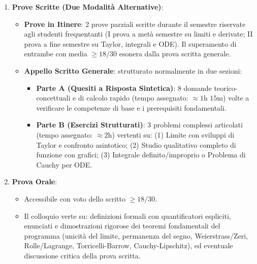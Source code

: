 \documentclass[11pt,a4paper,twoside,openright]{book}
\begin{document}
\begin{metodo}
\begin{enumerate}
    \item \textbf{Prove Scritte (Due Modalità Alternative)}:
    \begin{itemize}
        \item \textbf{Prove in Itinere}: 2 prove parziali scritte durante il semestre riservate agli studenti frequentanti (I prova a metà semestre su limiti e derivate; II prova a fine semestre su Taylor, integrali e ODE). Il superamento di entrambe con media $\ge 18/30$ esonera dalla prova scritta generale.
        \item \textbf{Appello Scritto Generale}: strutturato normalmente in due sezioni:
        \begin{itemize}
            \item \textbf{Parte A (Quesiti a Risposta Sintetica)}: 8 domande teorico-concettuali e di calcolo rapido (tempo assegnato: $\approx 1\text{h } 15\text{m}$) volte a verificare le competenze di base e i prerequisiti fondamentali.
            \item \textbf{Parte B (Esercizi Strutturati)}: 3 problemi complessi articolati (tempo assegnato: $\approx 2\text{h}$) vertenti su: (1) Limite con sviluppi di Taylor e confronto asintotico; (2) Studio qualitativo completo di funzione con grafici; (3) Integrale definito/improprio o Problema di Cauchy per ODE.
        \end{itemize}
    \end{itemize}
    \item \textbf{Prova Orale}:
    \begin{itemize}
        \item Accessibile con voto dello scritto $\ge 18/30$.
        \item Il colloquio verte su: definizioni formali con quantificatori espliciti, enunciati e dimostrazioni rigorose dei teoremi fondamentali del programma (unicità del limite, permanenza del segno, Weierstrass/Zeri, Rolle/Lagrange, Torricelli-Barrow, Cauchy-Lipschitz), ed eventuale discussione critica della prova scritta.
    \end{itemize}
\end{enumerate}
\end{metodo}
\end{document}
